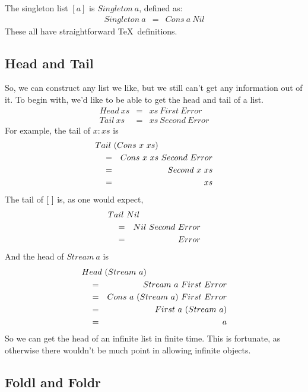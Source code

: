 The singleton list $[a]$ is $Singleton~a$, defined as:
\begin{eqnarray*}
   Singleton~a  &  =  &  Cons~a~Nil
\end{eqnarray*}
These all have straightforward \TeX\ definitions.
\begin{TeXcode}
\let\Nil=\Second
\def\Cons#1#2#3#4{#3{#1}{#2}}
\def\Stream#1{\Cons{#1}{\Stream{#1}}}
\def\Singleton#1{\Cons{#1}\Nil}
\end{TeXcode}

\subsection{Head and Tail}

So, we can construct any list we like, but we still can't get any information
out of it.  To begin with, we'd like to be able to get the head
and tail of a list.
\begin{eqnarray*}
   Head~xs  &  =  &  xs~First~Error  \\
   Tail~xs  &  =  &  xs~Second~Error
\end{eqnarray*}
For example, the tail of $x:xs$ is
\begin{eqnarray*}
   \start{Tail~(Cons~x~xs)}  
   &  =  &  Cons~x~xs~Second~Error  \\
   &  =  &  Second~x~xs  \\
   &  =  &  \Tail{\Cons{x}{xs}}
\end{eqnarray*}
The tail of $[\,\,]$ is, as one would expect,
\begin{eqnarray*}
   \start{Tail~Nil}  
   &  =  &  Nil~Second~Error  \\
   &  =  &  Error
\end{eqnarray*}
And the head of $Stream~a$ is
\begin{eqnarray*}
   \start{Head~(Stream~a)}  
   &  =  &  Stream~a~First~Error  \\
   &  =  &  Cons~a~(Stream~a)~First~Error  \\
   &  =  &  First~a~(Stream~a)  \\
   &  =  &  \Head{\Stream{a}}
\end{eqnarray*}
So we can get the head of an infinite list in finite time.  This is
fortunate, as otherwise there wouldn't be much point in allowing
infinite objects. 
\begin{TeXcode}
\def\Head#1{#1\First\Error}
\def\Tail#1{#1\Second\Error}
\end{TeXcode}

\subsection{Foldl and Foldr}


